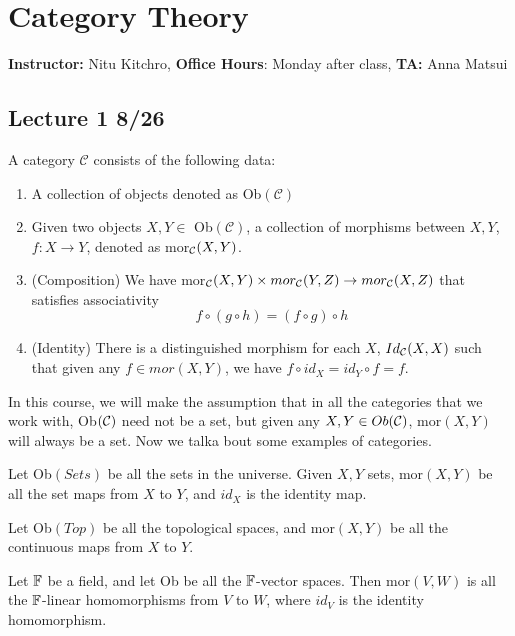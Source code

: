 \chapter{Category Theory}
\textbf{Instructor:} Nitu Kitchro, 
\textbf{Office Hours}: Monday after class, \textbf{TA: } Anna Matsui
\section{Lecture 1 8/26}
\begin{defn}[Category]
    A category $\mathcal{C}$ consists of the following data:
    \begin{enumerate}
        \item A collection of objects denoted as Ob$(\mathcal{C})$
        \item Given two objects $X,Y\in$ Ob$(\mathcal{C})$, a collection of morphisms between $X,Y$, $f:X\to Y$, denoted as mor$_{\mathcal{C}}(X,Y)$.
        \item (Composition) We have mor$_{\mathcal{C}}(X,Y)\times mor_{\mathcal{C}}(Y,Z)\to mor_{\mathcal{C}}(X,Z)$ that satisfies associativity
        \begin{equation*}
            f\circ(g\circ h)=(f\circ g)\circ h
        \end{equation*}
        \item (Identity) There is a distinguished morphism for each $X$, $Id_{\mathcal{C}}(X,X)$ such that given any $f\in mor(X,Y)$, we have $f\circ id_X=id_Y\circ f=f$.
    \end{enumerate}
\end{defn}
In this course, we will make the assumption that in all the categories that we work with, Ob$(\mathcal{C})$ need not be a set, but given any $X,Y\in Ob(\mathcal{C})$, mor$(X,Y)$ will always be a set. Now we talka bout some examples of categories.
\begin{example}[Sets]
    Let Ob$(Sets)$ be all the sets in the universe. Given $X,Y$ sets, mor$(X,Y)$ be all the set maps from $X$ to $Y$, and $id_X$ is the identity map.
\end{example}
\begin{example}[Top]
    Let Ob$(Top)$ be all the topological spaces, and mor$(X,Y)$ be all the continuous maps from $X$ to $Y$.
\end{example}
\begin{example}[Vect$_\F$]
    Let $\mathbb{F}$ be a field, and let Ob be all the $\mathbb{F}$-vector spaces. Then mor$(V,W)$ is all the $\mathbb{F}$-linear homomorphisms from $V$ to $W$, where $id_V$ is the identity homomorphism.
\end{example}
